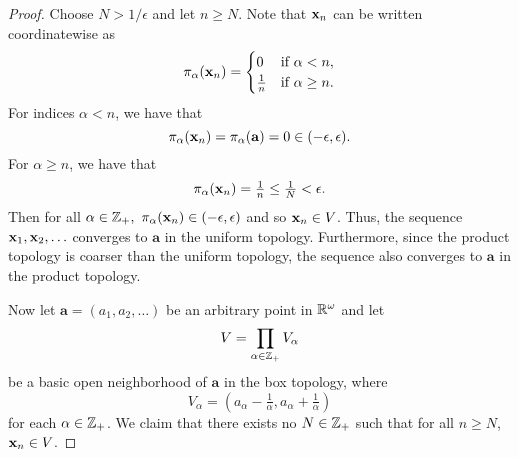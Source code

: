 \begin{solution}
\begin{proof}
        Choose $N > 1 / \epsilon$ and let $n \geq N$.
        Note that $\mathbf{x}_n$ can be written coordinatewise as
        \begin{equation*}
            \pi_\alpha(\mathbf{x}_n) = \begin{cases}
                0               & \text{if } \alpha < n, \\
                \tfrac{1}{n}    & \text{if } \alpha \geq n.
            \end{cases}
        \end{equation*}
        For indices $\alpha < n$, we have that
        \begin{equation*}
            \pi_\alpha(\mathbf{x}_n) = \pi_\alpha(\mathbf{a}) = 0 \in (-\epsilon, \epsilon).
        \end{equation*}
        For $\alpha \geq n$, we have that
        \begin{equation*}
            \pi_\alpha(\mathbf{x}_n) = \tfrac{1}{n} \leq \tfrac{1}{N} < \epsilon.
        \end{equation*}
        Then for all $\alpha \in \mathbb{Z}_+,~ \pi_\alpha(\mathbf{x}_n) \in (-\epsilon, \epsilon)$ and so $\mathbf{x}_n \in V$.
        Thus, the sequence $\mathbf{x}_1, \mathbf{x}_2, \ldots$ converges to $\mathbf{a}$ in the uniform topology.
        Furthermore, since the product topology is coarser than the uniform topology, the sequence also converges to $\mathbf{a}$ in the product topology.

        Now let $\mathbf{a} = (a_1, a_2, \ldots)$ be an arbitrary point in $\mathbb{R}^\omega$ and let
        \begin{equation*}
            V = \prod_{\alpha\in\mathbb{Z}_+} V_\alpha
        \end{equation*}
        be a basic open neighborhood of $\mathbf{a}$ in the box topology, where
        \begin{equation*}
            V_\alpha = (a_\alpha - \tfrac{1}{\alpha}, a_\alpha + \tfrac{1}{\alpha})
        \end{equation*}
        for each $\alpha \in \mathbb{Z}_+$.
        We claim that there exists no $N \in \mathbb{Z}_+$ such that for all $n \geq N$, $\mathbf{x}_n \in V$.


\end{proof}
\end{solution}
